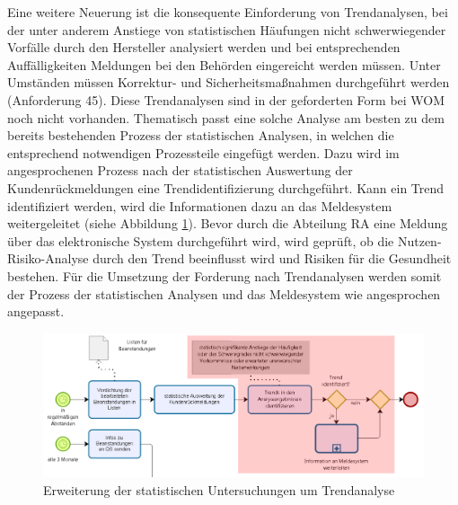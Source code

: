 \documentclass[a4paper,12pt]{report}
\begin{document}
Eine weitere Neuerung ist die konsequente Einforderung von Trendanalysen, bei der unter anderem Anstiege von statistischen Häufungen nicht schwerwiegender Vorfälle durch den Hersteller analysiert werden und bei entsprechenden Auffälligkeiten Meldungen bei den Behörden eingereicht werden müssen. Unter Umständen müssen Korrektur- und Sicherheitsmaßnahmen durchgeführt werden (Anforderung 45). Diese Trendanalysen sind in der geforderten Form bei WOM noch nicht vorhanden. Thematisch passt eine solche Analyse am besten zu dem bereits bestehenden Prozess der statistischen Analysen, in welchen die entsprechend notwendigen Prozessteile eingefügt werden. Dazu wird im angesprochenen Prozess nach der statistischen Auswertung der Kundenrückmeldungen eine Trendidentifizierung durchgeführt. Kann ein Trend identifiziert werden, wird die Informationen dazu an das Meldesystem weitergeleitet (siehe Abbildung \ref{statistic_trend_analysis}). Bevor durch die Abteilung RA eine Meldung über das elektronische System durchgeführt wird, wird geprüft, ob die Nutzen-Risiko-Analyse durch den Trend beeinflusst wird und Risiken für die Gesundheit bestehen. Für die Umsetzung der Forderung nach Trendanalysen werden somit der Prozess der statistischen Analysen und das Meldesystem wie angesprochen angepasst.
\begin{figure}[ht]
\centering
\includegraphics[width=1\textwidth]{Images/statistic_trend_analysis}
\caption[Erweiterung der statistischen Untersuchungen um Trendanalyse]{Erweiterung der statistischen Untersuchungen um Trendanalyse}
\label{statistic_trend_analysis}
\end{figure}
\def\FE{F\&E-Bereich }
\end{document}
